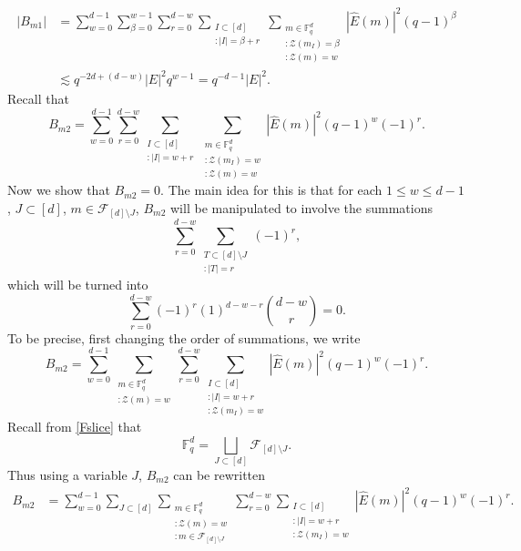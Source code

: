 \documentclass[a4paper,11pt]{amsart}
\numberwithin{equation}{section}
\def\Fq#1{\mathbb{F}_q^{#1}}
\begin{document}
\begin{align}
|B_{m1}| &= 
\sum_{w = 0}^{d-1} \sum_{\beta = 0}^{w-1} \sum_{r = 0}^{d - w} \sum_{\substack{I \subset [d] \\ :|I| = \beta + r }} \sum_{\substack{{m \in \mathbb{F}_q^d}  \\  { :\mathcal{Z}(m_I) = \beta}\\{:\mathcal{Z}(m) = w}}} |\widehat{E}(m)|^2 (q - 1)^{\beta}
\nonumber
\\
&\label{err}\lesssim  
q^{-2d+(d-w)}|E|^2q^{w-1} =q^{-d-1}|E|^2.
\end{align}
Recall that
\begin{equation*}
    B_{m2} = 
    \sum_{w = 0}^{d-1} \sum_{r = 0}^{d - w} \sum_{\substack{I \subset [d] \\ :|I| = w + r }} \sum_{\substack{{m \in \mathbb{F}_q^d}  \\  { :\mathcal{Z}(m_I) = w} \\ {:\mathcal{Z}(m) = w}}} |\widehat{E}(m)|^2 (q - 1)^{w} (-1)^r.
\end{equation*}
 Now we show that $B_{m2} = 0$. The main idea for this is that for each $1 \leq w \leq d-1$, $J \subset [d]$, $m \in \mathcal{F}_{[d]\setminus J}$, $B_{m2} $ will be manipulated to involve the summations
 \begin{equation}\label{Zerosum}
 \sum_{r = 0}^{d-w}\sum_{\substack{{T \subset [d]\setminus J}\\{:|T| = r}}}(-1)^{r},
 \end{equation}
 which  will be turned into 
 \[
 \sum_{r = 0}^{d-w}(-1)^{r}(1)^{d-w-r}\binom{d-w}{r}=0.
 \]
To be precise, first changing the order of summations, we write
\begin{equation*}
   B_{m2}=
    \sum_{w = 0}^{d-1} \sum_{\substack{m \in \mathbb{F}_q^d\\ {:\mathcal{Z}(m) = w}}}\sum_{r = 0}^{d-w}\sum_{\substack{I \subset [d]\\{:|I| = w + r} \\ {:\mathcal{Z}(m_I) = w}}}|\widehat{E}(m)|^2 (q-1)^w(-1)^{r}.
\end{equation*}
Recall from \eqref{Fslice} that 
\begin{equation}\label{FJslice}
\Fq{d} = \bigsqcup_{J \subset [d]} \mathcal{F}_{[d] \setminus J}.
\end{equation}
Thus using a variable $J$,  $B_{m2}$  can be rewritten
\begin{align*}
    B_{m2} &= 
    \sum_{w = 0}^{d-1} \sum_{J \subset [d]}\sum_{\substack{{m \in \mathbb{F}_q^d} \\ {:\mathcal{Z}(m) = w} \\ {:m \in \mathcal{F}_{[d]\setminus J}}}}\sum_{r = 0}^{d-w}\sum_{\substack{I \subset [d]\\{:|I| = w + r} \\ {:\mathcal{Z}(m_I) = w}}}|\widehat{E}(m)|^2 (q-1)^w(-1)^{r}.
\end{align*}
\end{document}

